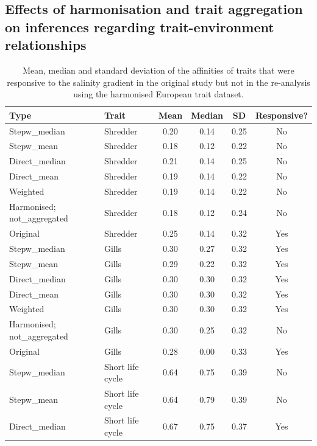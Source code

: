 \documentclass[12pt]{article}
\begin{document}
\newpage

\subsection*{Effects of harmonisation and trait aggregation on inferences regarding trait-environment relationships}

\begin{table}[H]
    \centering
    \caption{Mean, median and standard deviation of the affinities of traits that were responsive to the salinity gradient in the original study but not in the re-analysis using the harmonised European trait dataset.} 
    \label{tab:SI_resp_traits_summary_stats}
    \begin{tabular}{l|l|c|c|c|c}
    \toprule[.1em]
    Type & Trait & Mean & Median & SD & Responsive? \\ 
    \toprule[.1em]
    Stepw\_median & Shredder & 0.20 & 0.14 & 0.25 & No \\ 
      Stepw\_mean & Shredder & 0.18 & 0.12 & 0.22 & No\\ 
      Direct\_median & Shredder & 0.21 & 0.14 & 0.25 & No\\ 
      Direct\_mean & Shredder & 0.19 & 0.14 & 0.22 & No\\ 
      Weighted & Shredder & 0.19 & 0.14 & 0.22 & No \\ 
      Harmonised; not\_aggregated & Shredder & 0.18 & 0.12 & 0.24 & No \\ 
      Original & Shredder & 0.25 & 0.14 & 0.32 & Yes\\ 
      \midrule
      Stepw\_median & Gills & 0.30 & 0.27 & 0.32 & Yes\\ 
      Stepw\_mean & Gills & 0.29 & 0.22 & 0.32 & Yes\\ 
      Direct\_median & Gills & 0.30 & 0.30 & 0.32 & Yes\\ 
      Direct\_mean & Gills & 0.30 & 0.30 & 0.32 & Yes\\ 
      Weighted & Gills & 0.30 & 0.30 & 0.32 & Yes\\ 
      Harmonised; not\_aggregated & Gills & 0.30 & 0.25 & 0.32 & No \\ 
      Original & Gills & 0.28 & 0.00 & 0.33 & Yes \\ 
      \midrule
      Stepw\_median & Short life cycle & 0.64 & 0.75 & 0.39 & No \\ 
      Stepw\_mean & Short life cycle & 0.64 & 0.79 & 0.39 & No \\ 
      Direct\_median & Short life cycle & 0.67 & 0.75 & 0.37 & Yes \\ 

\end{tabular}
\end{table}
\end{document}
